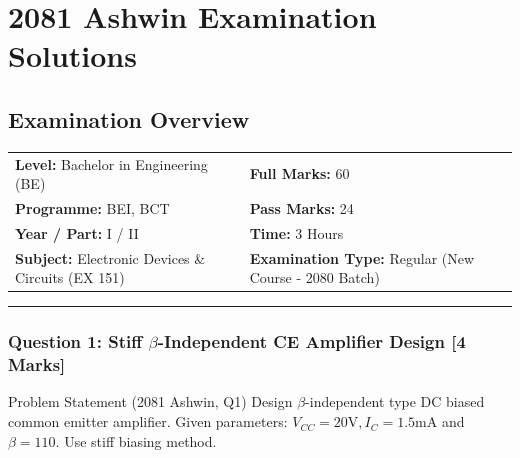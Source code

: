 \documentclass[11pt,a4paper,oneside]{book}
\begin{document}
\chapter{2081 Ashwin Examination Solutions}

\section*{Examination Overview}
\begin{tabular}{@{}ll@{}}
\textbf{Level:} Bachelor in Engineering (BE) & \textbf{Full Marks:} 60 \\
\textbf{Programme:} BEI, BCT & \textbf{Pass Marks:} 24 \\
\textbf{Year / Part:} I / II & \textbf{Time:} 3 Hours \\
\textbf{Subject:} Electronic Devices \& Circuits (EX 151) & \textbf{Examination Type:} Regular (New Course - 2080 Batch) \\
\end{tabular}

\vspace{0.6cm}
\hrule
\vspace{0.6cm}

\subsection{Question 1: Stiff $\beta$-Independent CE Amplifier Design [4 Marks]}
\begin{questionbox}{Problem Statement (2081 Ashwin, Q1)}
Design $\beta$-independent type DC biased common emitter amplifier. Given parameters: $V_{CC} = 20\text{V}, I_C = 1.5\text{mA}$ and $\beta = 110$. Use stiff biasing method.
\end{questionbox}
\end{document}
